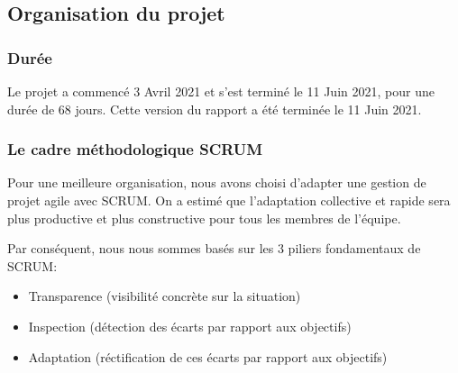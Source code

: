\documentclass[12pt]{article}
\begin{document}

\subsection{Organisation du projet}
\subsubsection{Durée}
Le projet a commencé 3 Avril 2021 et s'est terminé le 11 Juin 2021, pour une durée de 68 jours. Cette version du rapport a été terminée le 11 Juin 2021.

\subsubsection{Le cadre méthodologique SCRUM}

Pour une meilleure organisation, nous avons choisi d'adapter une gestion de projet agile avec SCRUM. On a estimé que l'adaptation collective et rapide sera plus productive et plus constructive pour tous les membres de l'équipe.

Par conséquent, nous nous sommes basés sur les 3 piliers fondamentaux de SCRUM: 
\begin{itemize}[label=\textbullet]
    \item Transparence (visibilité concrète sur la situation)
    \item Inspection (détection des écarts par rapport aux objectifs)
    \item Adaptation (réctification de ces écarts par rapport aux objectifs)
\end{itemize}
\end{document}
